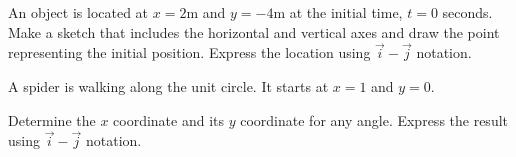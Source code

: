 
\begin{problem}
\item An object is located at $x=2$m and $y=-4$m at the initial time,
  $t=0$ seconds. Make a sketch that includes the horizontal and vertical
  axes and draw the point representing the initial position.
  Express the location using $\vec{i}-\vec{j}$ notation.
  \vfill
\item A spider is walking along the unit circle. It starts at $x=1$
  and $y=0$.

  \scalebox{0.35}{}

  Determine the $x$ coordinate and its $y$ coordinate for any
  angle. Express the result using $\vec{i}-\vec{j}$ notation.

  \vfill
\end{problem}



